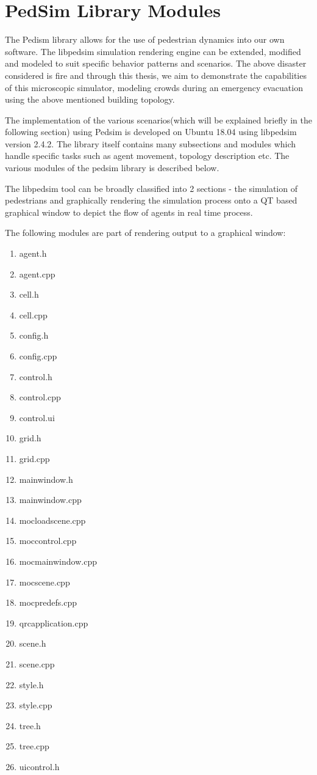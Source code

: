 \section{PedSim Library Modules}
\label{sec: PedSim Library Modules}

The Pedism library allows for the use of pedestrian dynamics into our own software. The libpedsim simulation rendering engine can be extended, modified and modeled to suit specific behavior patterns and scenarios. The above disaster considered is fire and through this thesis, we aim to demonstrate the capabilities of this microscopic simulator, modeling crowds during an emergency evacuation using the above mentioned building topology. 

The implementation of the various scenarios(which will be explained briefly in the following section) using Pedsim is developed on Ubuntu 18.04 using libpedsim version 2.4.2.
The library itself contains many subsections and modules which handle specific tasks such as agent movement, topology description etc. The various modules of the pedsim library is described below.

The libpedsim tool can be broadly classified into 2 sections - the simulation of pedestrians and graphically rendering the simulation process onto a QT based graphical window to depict the flow of agents in real time process.

The following modules are part of rendering output to a graphical window:


\begin{enumerate}
  \item agent.h
  \item agent.cpp
  \item cell.h
  \item cell.cpp
  \item config.h
  \item config.cpp
  \item control.h
  \item control.cpp
  \item control.ui
  \item grid.h
  \item grid.cpp
  \item mainwindow.h
  \item mainwindow.cpp
  \item moc\textunderscore loadscene.cpp
  \item moc\textunderscore control.cpp
  \item moc\textunderscore mainwindow.cpp
  \item moc\textunderscore scene.cpp
  \item moc\textunderscore predefs.cpp
  \item qrc\textunderscore application.cpp
  \item scene.h
  \item scene.cpp
  \item style.h
  \item style.cpp
  \item tree.h
  \item tree.cpp
  \item ui\textunderscore control.h
\end{enumerate}

